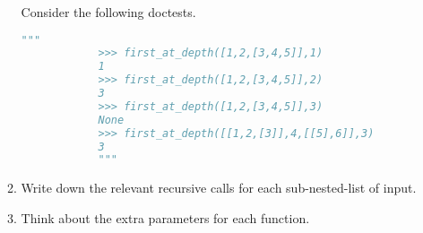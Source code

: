 \documentclass[12pt]{article}
\begin{document}
\begin{enumerate}[a.]
\begin{mdframed}
\begin{enumerate}[1.]
\begin{mdframed}
            \bigskip

            Consider the following doctests.

            \begin{lstlisting}[language=python]
            """
            >>> first_at_depth([1,2,[3,4,5]],1)
            1
            >>> first_at_depth([1,2,[3,4,5]],2)
            3
            >>> first_at_depth([1,2,[3,4,5]],3)
            None
            >>> first_at_depth([[1,2,[3]],4,[[5],6]],3)
            3
            """
            \end{lstlisting}

            \end{mdframed}

            \item Write down the relevant recursive calls for each sub-nested-list of input.
            \item Think about the extra parameters for each function.
        \end{enumerate}

    \end{mdframed}

\end{enumerate}
\end{document}
